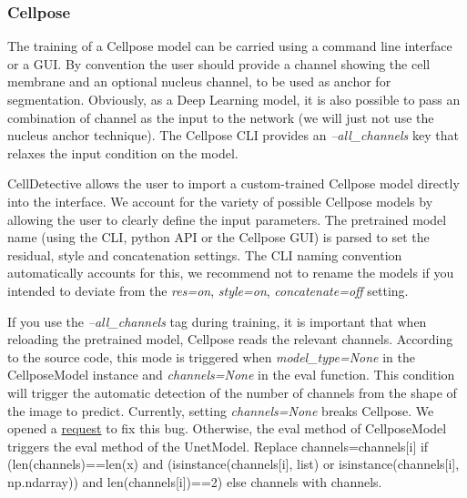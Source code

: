\documentclass[10pt,a4paper]{article}
\begin{document}
	\subsubsection{Cellpose}
	
	The training of a Cellpose model can be carried using a command line interface or a GUI. By convention the user should provide a channel showing the cell membrane and an optional nucleus channel, to be used as anchor for segmentation. Obviously, as a Deep Learning model, it is also possible to pass an combination of channel as the input to the network (we will just not use the nucleus anchor technique). The Cellpose CLI provides an \textit{--all\_channels} key that relaxes the input condition on the model. 
	
	CellDetective allows the user to import a custom-trained Cellpose model directly into the interface. We account for the variety of possible Cellpose models by allowing the user to clearly define the input parameters. The pretrained model name (using the CLI, python API or the Cellpose GUI) is parsed to set the residual, style and concatenation settings. The CLI naming convention automatically accounts for this, we recommend not to rename the models if you intended to deviate from the \textit{res=on}, \textit{style=on}, \textit{concatenate=off} setting. 
	
	If you use the \textit{--all\_channels} tag during training, it is important that when reloading the pretrained model, Cellpose reads the relevant channels. According to the source code, this mode is triggered when \textit{model\_type=None} in the CellposeModel instance and \textit{channels=None} in the eval function. This condition will trigger the automatic detection of the number of channels from the shape of the image to predict. Currently, setting \textit{channels=None} breaks Cellpose. We opened a \href{https://github.com/MouseLand/cellpose/issues/762}{request} to fix this bug. Otherwise, the eval method of CellposeModel triggers the eval method of the UnetModel. Replace channels=channels[i] if (len(channels)==len(x) and (isinstance(channels[i], list) or isinstance(channels[i], np.ndarray)) and len(channels[i])==2) else channels with channels.
	
\end{document}
